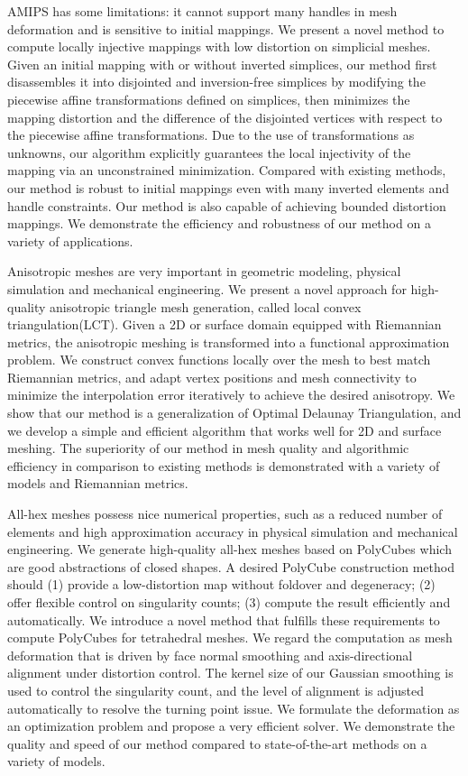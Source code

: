 \begin{enabstract}
AMIPS has some limitations: it cannot support many handles in mesh deformation and is sensitive to initial mappings. We present a novel method to compute locally injective mappings with low distortion on simplicial meshes.  Given an initial mapping with or without inverted simplices, our method first disassembles it into disjointed and inversion-free simplices by modifying the piecewise affine transformations defined on simplices, then minimizes the mapping distortion and the difference of the disjointed vertices with respect to the piecewise affine transformations. Due to the use of transformations as unknowns, our algorithm explicitly guarantees the local injectivity of the mapping via an unconstrained minimization. Compared with existing methods, our method is robust to initial mappings even with many inverted elements and handle constraints. Our method is also capable of achieving bounded distortion mappings. We demonstrate the efficiency and robustness of our method on a variety of applications.

Anisotropic meshes are very important in geometric modeling, physical simulation and mechanical engineering. We present a novel approach for high-quality anisotropic triangle mesh generation, called local convex triangulation(LCT).
Given a 2D or surface domain equipped with Riemannian metrics, the anisotropic meshing is transformed into a functional approximation problem. We construct convex functions locally over the mesh to best match Riemannian metrics, and adapt vertex positions and mesh connectivity to minimize the interpolation error iteratively to achieve the desired anisotropy. We show that our method is a generalization of Optimal Delaunay Triangulation, and we develop a simple and efficient algorithm that works well for 2D and surface meshing. The superiority of our method in mesh quality and algorithmic efficiency in comparison to existing methods is demonstrated with a variety of models and Riemannian metrics.

All-hex meshes possess nice numerical properties, such as a reduced number of elements and high approximation accuracy in physical simulation and mechanical engineering. We generate high-quality all-hex meshes based on PolyCubes which are good abstractions of closed shapes.  A desired PolyCube construction method should (1) provide a low-distortion map without foldover and degeneracy; (2) offer flexible control on singularity counts; (3) compute the result efficiently and automatically. We introduce a novel method that fulfills these requirements to compute PolyCubes for tetrahedral meshes. We regard the computation as mesh deformation that is driven by face normal smoothing and axis-directional alignment under distortion control.
The kernel size of our Gaussian smoothing is used to control the singularity count, and the level of alignment is adjusted automatically to resolve the turning point issue.  We formulate the deformation as an optimization problem and propose a very efficient solver.
We demonstrate the quality and speed of our method compared to state-of-the-art methods on a variety of models.

\end{enabstract}
